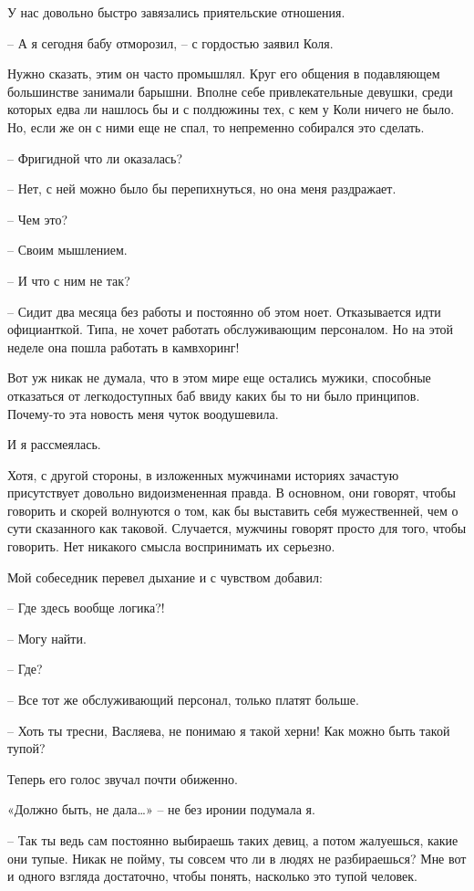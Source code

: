 \documentclass[
]{book}
\begin{document}
У нас довольно быстро завязались приятельские отношения.

-- А я сегодня бабу отморозил, -- с гордостью заявил Коля.

Нужно сказать, этим он часто промышлял. Круг его общения в подавляющем большинстве занимали барышни. Вполне себе привлекательные девушки, среди которых едва ли нашлось бы и с полдюжины тех, с кем у Коли ничего не было. Но, если же он с ними еще не спал, то непременно собирался это сделать.

-- Фригидной что ли оказалась?

-- Нет, с ней можно было бы перепихнуться, но она меня раздражает.

-- Чем это?

-- Своим мышлением.

-- И что с ним не так?

-- Сидит два месяца без работы и постоянно об этом ноет. Отказывается идти официанткой. Типа, не хочет работать обслуживающим персоналом. Но на этой неделе она пошла работать в камвхоринг!

Вот уж никак не думала, что в этом мире еще остались мужики, способные отказаться от легкодоступных баб ввиду каких бы то ни было принципов. Почему-то эта новость меня чуток воодушевила.

И я рассмеялась.

Хотя, с другой стороны, в изложенных мужчинами историях зачастую присутствует довольно видоизмененная правда. В основном, они говорят, чтобы говорить и скорей волнуются о том, как бы выставить себя мужественней, чем о сути сказанного как таковой. Случается, мужчины говорят просто для того, чтобы говорить. Нет никакого смысла воспринимать их серьезно.

Мой собеседник перевел дыхание и с чувством добавил:

-- Где здесь вообще логика?!

-- Могу найти.

-- Где?

-- Все тот же обслуживающий персонал, только платят больше.

-- Хоть ты тресни, Васляева, не понимаю я такой херни! Как можно быть такой тупой?

Теперь его голос звучал почти обиженно.

«Должно быть, не дала\ldots» -- не без иронии подумала я.

-- Так ты ведь сам постоянно выбираешь таких девиц, а потом жалуешься, какие они тупые. Никак не пойму, ты совсем что ли в людях не разбираешься? Мне вот и одного взгляда достаточно, чтобы понять, насколько это тупой человек.
\end{document}
